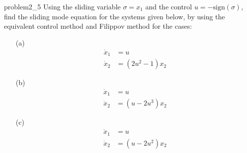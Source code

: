 \begin{problem}{2.5}{problem2_5}
Using the sliding variable $\sigma = x_1$ and the control $u = -\text{sign}(\sigma)$, find the sliding mode equation for the systems given below, by using the equivalent control method and Filippov method for the cases:

\begin{itemize}
	\item[(a)]
		\begin{align*}
			\dot{x}_1 & = u             \\
			\dot{x}_2 & = (2u^2 - 1)x_2
		\end{align*}
	\item[(b)]
		\begin{align*}
			\dot{x}_1 & = u             \\
			\dot{x}_2 & = (u - 2u^3)x_2
		\end{align*}
	\item[(c)]
		\begin{align*}
			\dot{x}_1 & = u             \\
			\dot{x}_2 & = (u - 2u^2)x_2
		\end{align*}
\end{itemize}
\end{problem}

